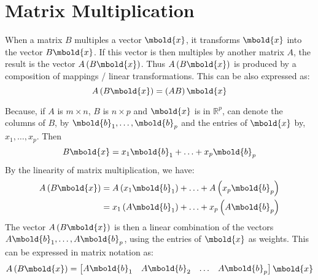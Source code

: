 \documentclass[12pt letter]{report}
\begin{document}
\section{Matrix Multiplication}

When a matrix $B$ multiples a vector $\mbold{x}$, it transforms $\mbold{x}$ into the vector $B\mbold{x}$. If this vector
is then multiples by another matrix $A$, the result is the vector $A \left( B \mbold{x}\right) $. Thus $A \left( B
  \mbold{x}\right) $ is produced by a composition of mappings / linear transformations. This can be also expressed as:
\[
  A \left( B \mbold{x}\right) = \left( AB \right) \mbold{x}
\]

Because, if $A$ is $m\times n$, $B$ is $n\times p$ and $\mbold{x}$ is in $\mathbb{R}^{p}$, can denote the columns of
$B$, by $\mbold{b}_1, \ldots, \mbold{b}_p$ and the entries of $\mbold{x}$ by, $x_1, \ldots, x_p$. Then
\[
  B \mbold{x} = x_1 \mbold{b}_1 + \ldots + x_p \mbold{b}_p
\]
By the linearity of matrix multiplication, we have:
\begin{align*}
  A \left( B \mbold{x} \right) & = A \left( x_1 \mbold{b}_1 \right) + \ldots + A \left( x_p \mbold{b}_p \right) \\
                               & = x_1 \left( A\mbold{b}_1 \right) + \ldots + x_p \left( A \mbold{b}_p \right)  \\
\end{align*}
The vector $A \left( B\mbold{x} \right) $ is then a linear combination of the vectors $A\mbold{b}_1, \ldots,
  A\mbold{b}_p$, using the entries of $\mbold{x}$ as weights. This can be expressed in matrix notation as:
\[
  A \left( B \mbold{x} \right)  = \begin{bmatrix} A \mbold{b}_1 & A \mbold{b}_2 & \ldots & A \mbold{b}_p \end{bmatrix}
  \mbold{x}
\]
\end{document}
